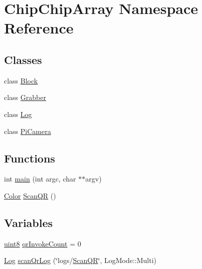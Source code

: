 \hypertarget{namespaceChipChipArray}{\section{Chip\+Chip\+Array Namespace Reference}
\label{namespaceChipChipArray}
}
\subsection*{Classes}
\begin{DoxyCompactItemize}
\item 
class \hyperlink{classChipChipArray_1_1Block}{Block}
\item 
class \hyperlink{classChipChipArray_1_1Grabber}{Grabber}
\item 
class \hyperlink{classChipChipArray_1_1Log}{Log}
\item 
class \hyperlink{classChipChipArray_1_1PiCamera}{Pi\+Camera}
\end{DoxyCompactItemize}
\subsection*{Functions}
\begin{DoxyCompactItemize}
\item 
int \hyperlink{namespaceChipChipArray_a7fc3d1edffca11531cd09fdab7c8b88d}{main} (int argc, char $\ast$$\ast$argv)
\item 
\hyperlink{definitions_8hpp_abc05a0f46084a3477cf5d5c939ff1436}{Color} \hyperlink{namespaceChipChipArray_a6c7465049b5d408e1a238b6d8ffa887d}{Scan\+Q\+R} ()
\end{DoxyCompactItemize}
\subsection*{Variables}
\begin{DoxyCompactItemize}
\item 
\hyperlink{definitions_8hpp_adde6aaee8457bee49c2a92621fe22b79}{uint8} \hyperlink{namespaceChipChipArray_a3b2a3c0ffa9f53021293aeb4955d2fef}{qr\+Invoke\+Count} = 0
\item 
\hyperlink{classChipChipArray_1_1Log}{Log} \hyperlink{namespaceChipChipArray_ab5c6290951637c25a5422707020fb3a8}{scan\+Qr\+Log} (\char`\"{}logs/\hyperlink{namespaceChipChipArray_a6c7465049b5d408e1a238b6d8ffa887d}{Scan\+Q\+R}\char`\"{}, Log\+Mode\+::\+Multi)
\end{DoxyCompactItemize}


